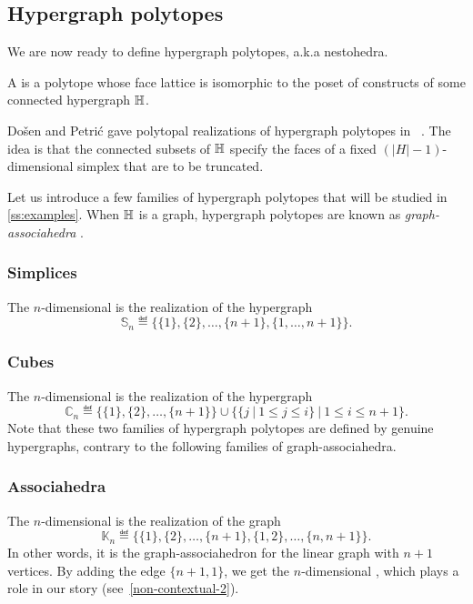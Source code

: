 
\subsection{Hypergraph polytopes}
\label{ss:hypergraph-polytopes}

We are now ready to define hypergraph polytopes, a.k.a nestohedra.

\begin{definition}
    A  is a polytope whose face lattice is isomorphic to the poset of constructs of some connected hypergraph ${\mathbb H}$.
\end{definition}

Do\v sen and Petri\'c gave polytopal realizations of hypergraph polytopes in ~\cite{DP-HP}.
The idea is that the connected subsets of ${\mathbb H}$ specify the faces of a fixed $(|H|-1)$-dimensional simplex that are to be truncated.

Let us introduce a few families of hypergraph polytopes that will be studied in \cref{ss:examples}.
When ${\mathbb H}$ is a graph, hypergraph polytopes are known as \emph{graph-associahedra} \cite{CD-CCGA}.

\subsubsection{Simplices}
The $n$-dimensional  is the realization of the hypergraph 
$$\mathbb{S}_n\eqdef  \{\{1\},\{2\},\ldots,\{n+1\},\{1,\ldots,n+1\}\}.$$

\subsubsection{Cubes}
The $n$-dimensional  is the realization of the hypergraph
$$\mathbb{C}_n\eqdef  
\{\{1\},\{2\},\ldots,\{n+1\}\}\cup\{\{j \ | \ 1 \leq j \leq i \} \ | \ 1 \leq i \leq n+1\}.$$
Note that these two families of hypergraph polytopes are defined by genuine hypergraphs, contrary to the following families of graph-associahedra.

\subsubsection{Associahedra}
The $n$-dimensional  is the realization of the graph 
$$\mathbb{K}_n\eqdef  \{\{1\},\{2\},\ldots,\{n+1\},\{1,2\},\ldots,\{n,n+1\}\}.$$
In other words, it is the graph-associahedron for the linear graph with $n+1$ vertices.
By adding the edge $\{n+1,1\}$, we get the $n$-dimensional , which plays a role in our story (see~\cref{non-contextual-2}).  

